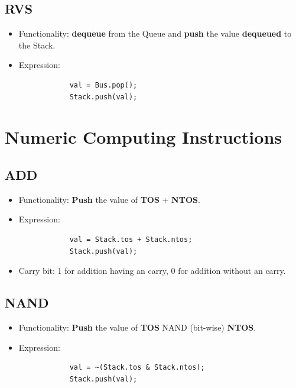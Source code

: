 \documentclass[11pt]{report}
\begin{document}
    \subsection{RVS}
    \begin{itemize}
        \item Functionality: \textbf{dequeue} from the Queue and \textbf{push} the value 
                    \textbf{dequeued} to the Stack.
        \item Expression:
        \begin{verbatim}
            val = Bus.pop();
            Stack.push(val);
        \end{verbatim}
    \end{itemize}

    \section{Numeric Computing Instructions}
    \subsection{ADD}
    \label{subsection:add}
    \begin{itemize}
        \item Functionality: \textbf{Push} the value of \textbf{TOS} + \textbf{NTOS}.
        \item Expression:
        \begin{verbatim}
            val = Stack.tos + Stack.ntos;
            Stack.push(val);
        \end{verbatim}
        \item Carry bit: 1 for addition having an carry, 0 for addition without an carry.
    \end{itemize}

    \subsection{NAND}
    \begin{itemize}
        \item Functionality: \textbf{Push} the value of \textbf{TOS} NAND (bit-wise) \textbf{NTOS}.
        \item Expression:
        \begin{verbatim}
            val = ~(Stack.tos & Stack.ntos);
            Stack.push(val);
        \end{verbatim}
    \end{itemize}
\end{document}
